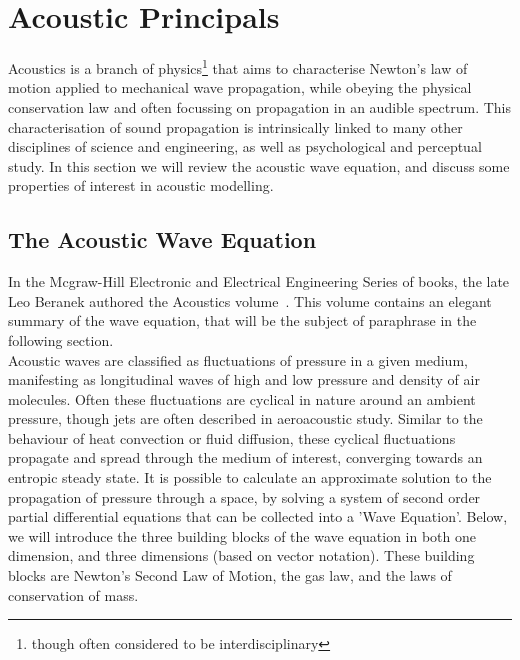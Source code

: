 %
%
%
\chapter{Acoustic Principals}
\label{Introduction}
Acoustics is a branch of physics\footnote{though often considered to be interdisciplinary} that aims to characterise Newton's law of motion applied to mechanical wave propagation, while obeying the physical conservation law and often focussing on propagation in an audible spectrum. This characterisation of sound propagation is intrinsically linked to many other disciplines of science and engineering, as well as psychological and perceptual study. In this section we will review the acoustic wave equation, and discuss some properties of interest in acoustic modelling.

\section{The Acoustic Wave Equation}

In the Mcgraw-Hill Electronic and Electrical Engineering Series of books, the late Leo Beranek authored the Acoustics volume~\cite{beranek1954acoustics}. This volume contains an elegant summary of the wave equation, that will be the subject of paraphrase in the following section.\\

Acoustic waves are classified as fluctuations of pressure in a given medium, manifesting as longitudinal waves of high and low pressure and density of air molecules. Often these fluctuations are cyclical in nature around an ambient pressure, though jets are often described in aeroacoustic study. Similar to the behaviour of heat convection or fluid diffusion, these cyclical fluctuations propagate and spread through the medium of interest, converging towards an entropic steady state. It is possible to calculate an approximate solution to the propagation of pressure through a space, by solving a system of second order partial differential equations that can be collected into a 'Wave Equation'. Below, we will introduce the three building blocks of the wave equation in both one dimension, and three dimensions (based on vector notation). These building blocks are Newton's Second Law of Motion, the gas law, and the laws of conservation of mass.\\

